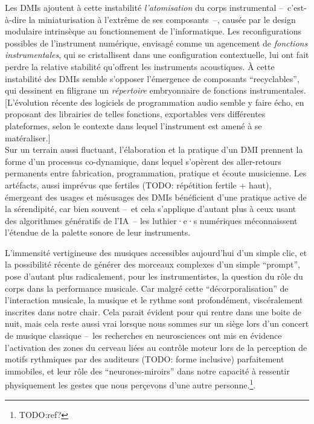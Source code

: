 Les \glspl{DMI} ajoutent à cette instabilité \textit{l'atomisation} du corps instrumental --~c'est-à-dire la miniaturisation à l'extrême de ses composants~--, causée par le design modulaire intrinsèque au fonctionnement de l'informatique. Les reconfigurations possibles de l'instrument numérique, envisagé comme un agencement de \textit{fonctions instrumentales}, qui se cristallisent dans une configuration contextuelle, lui ont fait perdre la relative stabilité qu'offrent les instruments acoustiques. À cette instabilité des \glspl{DMI} semble s'opposer l'émergence de composants ``recyclables'', qui dessinent en filigrane un \textit{répertoire} embryonnaire de fonctions instrumentales. [L'évolution récente des logiciels de programmation audio semble y faire écho, en proposant des librairies de telles fonctions, exportables vers différentes plateformes, selon le contexte dans lequel l'instrument est amené à se matéraliser.]\\
\indent Sur un terrain aussi fluctuant, l'élaboration et la pratique d'un \gls{DMI} prennent la forme d'un processus co-dynamique, dans lequel s'opèrent des aller-retours permanents entre fabrication, programmation, pratique et écoute musicienne.
Les artéfacts, aussi imprévus que fertiles (TODO: répétition fertile + haut), émergeant des usages et mésusages des \glspl{DMI} bénéficient d'une pratique active de la sérendipité, car bien souvent --~et cela s'applique d'autant plus à ceux usant des algorithmes génératifs de l'IA~-- les luthier·e·s numériques méconnaissent l'étendue de la palette sonore de leur instruments.

L'immensité vertigineuse des musiques accessibles aujourd'hui d'un simple clic, et la possibilité récente de générer des morceaux complexes d'un simple ``prompt'', pose d'autant plus radicalement, pour les instrumentistes, la question du rôle du corps dans la performance musicale. Car malgré cette ``décorporalisation'' de l'interaction musicale, la musique et le rythme sont profondément, viscéralement inscrites dans notre chair. Cela parait évident pour qui rentre dans une boite de nuit, mais cela reste aussi vrai lorsque nous sommes sur un siège lors d'un concert de musique classique --~les recherches en neurosciences ont mis en évidence l'activation des zones du cerveau liées au contrôle moteur lors de la perception de motifs rythmiques par des auditeurs (TODO: forme inclusive) parfaitement immobiles, et leur rôle des ``neurones-miroirs'' dans notre capacité à ressentir physiquement les gestes que nous perçevons d'une autre personne.\footnote{TODO:ref?}.\\

